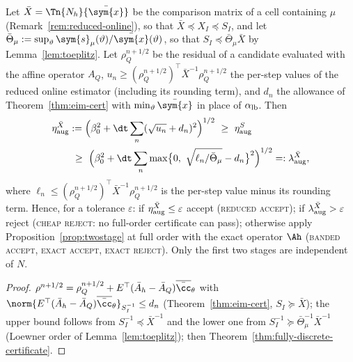 \begin{proposition}\label{prop:threestage}
Let $\bar X=\Tn{N_h}{\bar{\sym{x}}}$ be the comparison matrix of a cell containing $\mu$
(Remark~\ref{rem:reduced-online}), so that $\bar X\preceq X_I\preceq S_I$, and let
$\bar\Theta_\mu:=\sup_\vartheta\sym{s}_\mu(\vartheta)/\bar{\sym{x}}(\vartheta)$, so that
$S_I\preceq\bar\Theta_\mu\bar X$ by Lemma~\ref{lem:toeplitz}.  Let $\rho_Q^{n+1/2}$ be the residual of a
candidate evaluated with the affine operator $A_Q$, $u_n\ge(\rho_Q^{n+1/2})^\top\bar X^{-1}\rho_Q^{n+1/2}$
the per-step values of the reduced online estimator (including its rounding term), and $d_n$ the
allowance of Theorem~\ref{thm:eim-cert} with $\min_\vartheta\bar{\sym{x}}$ in place of $\alpha_{\rm lb}$.  Then
\begin{align*}
 \eta^{\bar X}_{\rm aug}&:=\Bigl(\beta_0^2+\dt\sum_n(\sqrt{u_n}+d_n)^2\Bigr)^{1/2}\ \ge\ \eta^S_{\rm aug}\\
 &\ \ge\ \Bigl(\beta_0^2+\dt\sum_n\max\bigl\{0,\ \sqrt{\ell_n/\bar\Theta_\mu}-d_n\bigr\}^2\Bigr)^{1/2}=:\lambda^{\bar X}_{\rm aug},
\end{align*}
where $\ell_n\le(\rho_Q^{n+1/2})^\top\bar X^{-1}\rho_Q^{n+1/2}$ is the per-step value minus its rounding
term.  Hence, for a tolerance $\varepsilon$: if $\eta^{\bar X}_{\rm aug}\le\varepsilon$ accept
(\textsc{reduced accept}); if $\lambda^{\bar X}_{\rm aug}>\varepsilon$ reject (\textsc{cheap reject}:
no full-order certificate can pass); otherwise apply Proposition~\ref{prop:twostage} at full order
with the exact operator $\Ah$ (\textsc{banded accept}, \textsc{exact accept}, \textsc{exact reject}).
Only the first two stages are independent of $N$.
\end{proposition}
\begin{proof}
$\rho^{n+1/2}=\rho_Q^{n+1/2}+E^\top(\bar A_h-\bar A_Q)\overline{\bar\cc}_\theta$ with
$\norm{E^\top(\bar A_h-\bar A_Q)\overline{\bar\cc}_\theta}_{S_I^{-1}}\le d_n$ (Theorem~\ref{thm:eim-cert},
$S_I\succeq\bar X$); the upper bound follows from $S_I^{-1}\preceq\bar X^{-1}$ and the lower one from
$S_I^{-1}\succeq\bar\Theta_\mu^{-1}\bar X^{-1}$ (Loewner order of Lemma~\ref{lem:toeplitz}); then
Theorem~\ref{thm:fully-discrete-certificate}.
\end{proof}
